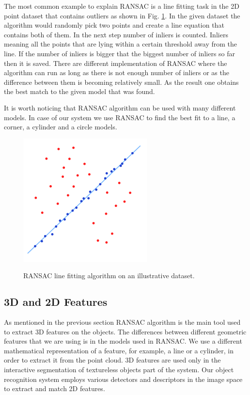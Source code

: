 The most common example to explain RANSAC is a line fitting task in the 2D point dataset that contains outliers as shown in Fig. \ref{fig:ransac}. In the given dataset the algorithm would randomly pick two points and create a line equation that contains both of them. In the next step number of inliers is counted. Inliers meaning all the points that are lying within a certain threshold away from the line. If the number of inliers is bigger that the biggest number of inliers so far then it is saved. There are different implementation of RANSAC where the algorithm can run as long as there is not enough number of inliers or as the difference between them is becoming relatively small. As the result one obtains the best match to the given model that was found.

It is worth noticing that RANSAC algorithm can be used with many different models. In case of our system we use RANSAC to find the best fit to a line, a corner, a cylinder and a circle models. 



\begin{figure}

{\includegraphics[width=0.5\columnwidth]{figures/ransac.png}}

\caption{RANSAC line fitting algorithm on an illustrative dataset.}
\label{fig:ransac}
\end{figure}



\subsection{3D and 2D Features}
As mentioned in the previous section RANSAC algorithm is the main tool used to extract 3D features on the objects. The differences between different geometric features that we are using is in the models used in RANSAC. We use a different mathematical representation of a feature, for example, a line or a cylinder, in order to extract it from the point cloud. 3D features are used only in the interactive segmentation of textureless objects part of the system. Our object recognition system employs various detectors and descriptors in the image space to extract and match 2D features.




